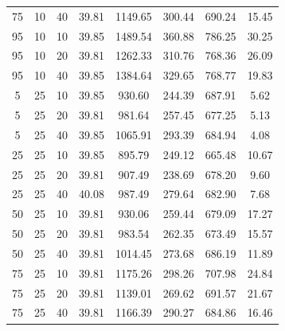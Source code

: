 \begin{table}[H]
\begin{tabular}{ccc|c|c|c|c|c}
75 & 10 & 40 & \cellcolor{gray!80}39.81 & \cellcolor{gray!10}1149.65 & \cellcolor{gray!1}300.44 & \cellcolor{gray!71}690.24 & 15.45\\
95 & 10 & 10 & \cellcolor{gray!80}39.85 & \cellcolor{gray!1}1489.54 & \cellcolor{gray!1}360.88 & \cellcolor{gray!42}786.25 & 30.25\\
95 & 10 & 20 & \cellcolor{gray!80}39.81 & \cellcolor{gray!1}1262.33 & \cellcolor{gray!1}310.76 & \cellcolor{gray!47}768.36 & 26.09\\
95 & 10 & 40 & \cellcolor{gray!80}39.85 & \cellcolor{gray!1}1384.64 & \cellcolor{gray!1}329.65 & \cellcolor{gray!47}768.77 & 19.83\\
5 & 25 & 10 & \cellcolor{gray!80}39.85 & \cellcolor{gray!46}930.60 & \cellcolor{gray!17}244.39 & \cellcolor{gray!72}687.91 & 5.62\\
5 & 25 & 20 & \cellcolor{gray!80}39.81 & \cellcolor{gray!38}981.64 & \cellcolor{gray!5}257.45 & \cellcolor{gray!75}677.25 & 5.13\\
5 & 25 & 40 & \cellcolor{gray!80}39.85 & \cellcolor{gray!24}1065.91 & \cellcolor{gray!1}293.39 & \cellcolor{gray!73}684.94 & 4.08\\
25 & 25 & 10 & \cellcolor{gray!80}39.85 & \cellcolor{gray!52}895.79 & \cellcolor{gray!13}249.12 & \cellcolor{gray!79}665.48 & 10.67\\
25 & 25 & 20 & \cellcolor{gray!80}39.81 & \cellcolor{gray!50}907.49 & \cellcolor{gray!23}238.69 & \cellcolor{gray!75}678.20 & 9.60\\
25 & 25 & 40 & \cellcolor{gray!78}40.08 & \cellcolor{gray!37}987.49 & \cellcolor{gray!1}279.64 & \cellcolor{gray!73}682.90 & 7.68\\
50 & 25 & 10 & \cellcolor{gray!80}39.81 & \cellcolor{gray!46}930.06 & \cellcolor{gray!3}259.44 & \cellcolor{gray!75}679.09 & 17.27\\
50 & 25 & 20 & \cellcolor{gray!80}39.81 & \cellcolor{gray!37}983.54 & \cellcolor{gray!1}262.35 & \cellcolor{gray!76}673.49 & 15.57\\
50 & 25 & 40 & \cellcolor{gray!80}39.81 & \cellcolor{gray!32}1014.45 & \cellcolor{gray!1}273.68 & \cellcolor{gray!72}686.19 & 11.89\\
75 & 25 & 10 & \cellcolor{gray!80}39.81 & \cellcolor{gray!5}1175.26 & \cellcolor{gray!1}298.26 & \cellcolor{gray!66}707.98 & 24.84\\
75 & 25 & 20 & \cellcolor{gray!80}39.81 & \cellcolor{gray!12}1139.01 & \cellcolor{gray!1}269.62 & \cellcolor{gray!71}691.57 & 21.67\\
75 & 25 & 40 & \cellcolor{gray!80}39.81 & \cellcolor{gray!7}1166.39 & \cellcolor{gray!1}290.27 & \cellcolor{gray!73}684.86 & 16.46\\

\end{tabular}
\end{table}
